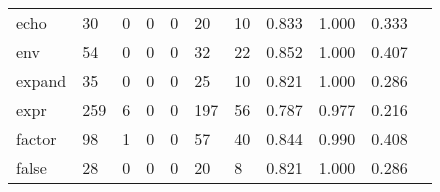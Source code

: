 \begin{longtable}{lp{1.20cm}p{1.20cm}p{1.20cm}p{1.20cm}p{1.20cm}p{1.20cm}p{1.20cm}p{1.20cm}p{1.20cm}p{1.20cm}}
echo      &                                    30 &                                                  0 &                                                  0 &                                                  0 &                                                 20 &                                                 10 &                                         0.833 &                                              1.000 &                                              0.333 \\
env       &                                    54 &                                                  0 &                                                  0 &                                                  0 &                                                 32 &                                                 22 &                                         0.852 &                                              1.000 &                                              0.407 \\
expand    &                                    35 &                                                  0 &                                                  0 &                                                  0 &                                                 25 &                                                 10 &                                         0.821 &                                              1.000 &                                              0.286 \\
expr      &                                   259 &                                                  6 &                                                  0 &                                                  0 &                                                197 &                                                 56 &                                         0.787 &                                              0.977 &                                              0.216 \\
factor    &                                    98 &                                                  1 &                                                  0 &                                                  0 &                                                 57 &                                                 40 &                                         0.844 &                                              0.990 &                                              0.408 \\
false     &                                    28 &                                                  0 &                                                  0 &                                                  0 &                                                 20 &                                                  8 &                                         0.821 &                                              1.000 &                                              0.286 \\

\end{longtable}

